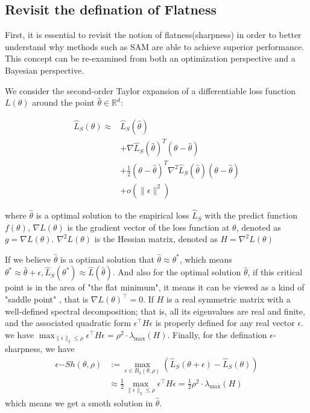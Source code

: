 \documentclass[letterpaper]{article} %
\begin{document}
\subsection{Revisit the defination of Flatness}

First, it is essential to revisit the notion of flatness(sharpness) in order to better understand why methods such as SAM are able to achieve superior performance. This concept can be re-examined from both an optimization perspective and a Bayesian perspective.

We consider the second-order Taylor expansion of a differentiable loss function $L(\theta)$ around the point $\hat{\theta} \in \mathbb{R}^d$:

\begin{equation}
\begin{aligned}
\widehat{L}_S(\theta) \approx& \widehat{L}_S(\hat{\theta}) \\
        &+\nabla \widehat{L}_S(\hat{\theta})^T(\theta-\hat{\theta}) \\
        &+\frac{1}{2}(\theta-\hat{\theta})^T \nabla^2 \widehat{L}_S(\hat{\theta})(\theta-\hat{\theta}) \\
        &+  o(\|\epsilon\|^2)
\end{aligned}
\end{equation}
  
where $\hat{\theta}$ is a optimal solution to the empirical loss $\hat{L}_S$  with  the predict function $f({\theta})$, $\nabla L(\theta)$ is the gradient vector of the loss function at $\theta$, denoted as $g = \nabla L(\theta)$. $\nabla^2 L(\theta)$ is the Hessian matrix, denoted as $H = \nabla^2 L(\theta)$ 

If we believe  $\hat{\theta}$ is a optimal solution that $\hat{\theta} \approx \theta ^*$, which means $\theta^* \approx \hat{\theta}+ \epsilon, \widehat{L}_{S}(\theta^*) \approx \widehat{L}(\hat{\theta})$. And also  for the optimal solution $\hat{\theta}$, if this critical point is in the area of "the flat minimum", it means it can be viewed as a kind of "saddle point" , that is $\nabla L(\theta)^\top=0$. If $H$ is a {real symmetric matrix} with a well-defined spectral decomposition; that is, all its eigenvalues are real and finite, and the associated quadratic form $\epsilon^\top H \epsilon$ is properly defined for any real vector $\epsilon$. we have $\max_{\|\epsilon\|_2 \leq \rho} \epsilon^\top H \epsilon =\rho^2 \cdot \lambda_{\max}(H) $.
Finally, for the defination  $\epsilon$-sharpness, we have
\begin{equation}
\begin{aligned}
        \epsilon{-Sh}({\theta},\rho) 
        &:= \max _{\epsilon \in B_2(\theta, \rho)}\left(\widehat{L}_S\left(\theta+\epsilon\right)-\widehat{L}_S(\theta)\right)   \\
        &\approx \frac{1}{2} \max_{\|\epsilon\|_2 \leq \rho} \epsilon^\top H \epsilon = \frac{1}{2} \rho^2 \cdot \lambda_{\max}(H)
\end{aligned}
\end{equation}
which means we get a smoth solution in $\hat{\theta}$.\
\end{document}
